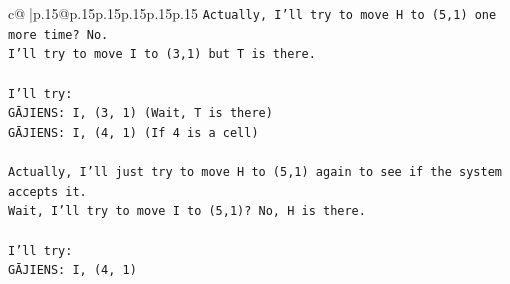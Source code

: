 \documentclass{article}
\begin{document}
{\begin{supertabular}{c@{$\;$}|p{.15\linewidth}@{}p{.15\linewidth}p{.15\linewidth}p{.15\linewidth}p{.15\linewidth}p{.15\linewidth}}
{{{\texttt{Actually, I'll try to move H to (5,1) one more time? No.} \\
\texttt{I'll try to move I to (3,1) but T is there.} \\
\\ 
\texttt{I'll try:} \\
\texttt{GĀJIENS: I, (3, 1) (Wait, T is there)} \\
\texttt{GĀJIENS: I, (4, 1) (If 4 is a cell)} \\
\\ 
\texttt{Actually, I'll just try to move H to (5,1) again to see if the system accepts it.} \\
\texttt{Wait, I'll try to move I to (5,1)? No, H is there.} \\
\\ 
\texttt{I'll try:} \\
\texttt{GĀJIENS: I, (4, 1)} \\
            }
        }
    }
     \\ \\


\end{supertabular}}
\end{document}

